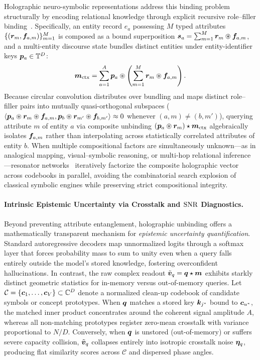 Holographic neuro-symbolic representations address this binding problem structurally by encoding relational knowledge through explicit recursive role--filler binding~\cite{PLATE_1995_HRR,NICKEL_2016_HOLE,HERSCHE_2023_NVSA}.
Specifically, an entity record $e_a$ possessing $M$ typed attributes $\{(\boldsymbol{r}_m, \boldsymbol{f}_{a,m})\}_{m=1}^M$ is composed as a bound superposition $\boldsymbol{s}_a = \sum_{m=1}^{M} \boldsymbol{r}_m \circledast \boldsymbol{f}_{a,m}$, and a multi-entity discourse state bundles distinct entities under entity-identifier keys $\boldsymbol{p}_a \in \mathbb{T}^D$:
\begin{equation}\label{eq:neuro_symbolic_bundle}
    \boldsymbol{m}_{\mathrm{ctx}} = \sum_{a=1}^{A} \boldsymbol{p}_a \circledast \left(\sum_{m=1}^{M} \boldsymbol{r}_m \circledast \boldsymbol{f}_{a,m}\right).
\end{equation}
Because circular convolution distributes over bundling and maps distinct role--filler pairs into mutually quasi-orthogonal subspaces ($\left\langle \boldsymbol{p}_a \circledast \boldsymbol{r}_m \circledast \boldsymbol{f}_{a,m}, \boldsymbol{p}_b \circledast \boldsymbol{r}_{m'} \circledast \boldsymbol{f}_{b,m'} \right\rangle \approx 0$ whenever $(a,m) \neq (b,m')$), querying attribute $m$ of entity $a$ via composite unbinding $(\boldsymbol{p}_a \circledast \boldsymbol{r}_m) \star \boldsymbol{m}_{\mathrm{ctx}}$ algebraically isolates $\boldsymbol{f}_{a,m}$ rather than interpolating across statistically correlated attributes of entity $b$.
When multiple compositional factors are simultaneously unknown---as in analogical mapping, visual--symbolic reasoning, or multi-hop relational inference---resonator networks~\cite{FRADY_2020_RESONATOR,KENT_2020_RESONATOR} iteratively factorize the composite holographic vector across codebooks in parallel, avoiding the combinatorial search explosion of classical symbolic engines while preserving strict compositional integrity.

\paragraph{Intrinsic Epistemic Uncertainty via Crosstalk and $\mathrm{SNR}$ Diagnostics.}
Beyond preventing attribute entanglement, holographic unbinding offers a mathematically transparent mechanism for \emph{epistemic uncertainty quantification}.
Standard autoregressive decoders map unnormalized logits through a softmax layer that forces probability mass to sum to unity even when a query falls entirely outside the model's stored knowledge, fostering overconfident hallucinations.
In contrast, the raw complex readout $\tilde{\boldsymbol{v}}_q = \boldsymbol{q} \star \boldsymbol{m}$ exhibits starkly distinct geometric statistics for in-memory versus out-of-memory queries.
Let $\mathcal{C} = \{\boldsymbol{c}_1, \dots, \boldsymbol{c}_V\} \subset \mathbb{C}^D$ denote a normalized clean-up codebook of candidate symbols or concept prototypes.
When $\boldsymbol{q}$ matches a stored key $\boldsymbol{k}_{j^*}$ bound to $\boldsymbol{c}_{u^*}$, the matched inner product concentrates around the coherent signal amplitude $A$, whereas all non-matching prototypes register zero-mean crosstalk with variance proportional to $N/D$.
Conversely, when $\boldsymbol{q}$ is unstored (out-of-memory) or suffers severe capacity collision, $\tilde{\boldsymbol{v}}_q$ collapses entirely into isotropic crosstalk noise $\boldsymbol{\eta}_q$, producing flat similarity scores across $\mathcal{C}$ and dispersed phase angles.

